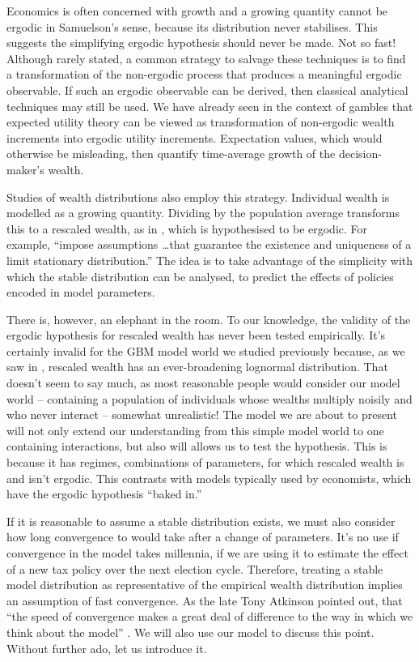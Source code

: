 Economics is often concerned with growth and a growing quantity cannot be ergodic in Samuelson's sense, because its distribution never stabilises. This suggests the simplifying ergodic hypothesis should never be made. Not so fast! Although rarely stated, a common strategy to salvage these techniques is to find a transformation of the non-ergodic process that produces a meaningful ergodic observable. If such an ergodic observable can be derived, then classical analytical techniques may still be used. We have already seen in the context of gambles that expected utility theory can be viewed as transformation of non-ergodic wealth increments into ergodic utility increments. Expectation values, which would otherwise be misleading, then quantify time-average growth of the decision-maker's wealth.

Studies of wealth distributions also employ this strategy. Individual wealth is modelled as a growing quantity. Dividing by the population average transforms this to a rescaled wealth, as in , which is hypothesised to be ergodic. For example, \cite[p.~130]{BenhabibBisinZhu2011} ``impose assumptions \dots that guarantee the existence and uniqueness of a limit stationary distribution.'' The idea is to take advantage of the simplicity with which the stable distribution can be analysed, \eg to predict the effects of policies encoded in model parameters.

There is, however, an elephant in the room. To our knowledge, the validity of the ergodic hypothesis for rescaled wealth has never been tested empirically. It's certainly invalid for the GBM model world we studied previously because, as we saw in , rescaled wealth has an ever-broadening lognormal distribution. That doesn't seem to say much, as most reasonable people would consider our model world -- containing a population of individuals whose wealths multiply noisily and who never interact -- somewhat unrealistic! The model we are about to present will not only extend our understanding from this simple model world to one containing interactions, but also will allows us to test the hypothesis. This is because it has regimes, \ie combinations of parameters, for which rescaled wealth is and isn't ergodic. This contrasts with models typically used by economists, which have the ergodic hypothesis ``baked in.''

If it is reasonable to assume a stable distribution exists, we must also consider how long convergence to would take after a change of parameters. It's no use if convergence in the model takes millennia, if we are using it to estimate the effect of a new tax policy over the next election cycle. Therefore, treating a stable model distribution as representative of the empirical wealth distribution implies an assumption of fast convergence.  As the late Tony Atkinson pointed out, that ``the speed of convergence makes a great deal of difference to the way in which we think about the model'' \cite{atkinson1969timescale}. We will also use our model to discuss this point. Without further ado, let us introduce it.


